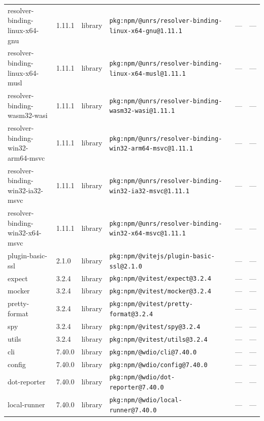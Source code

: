 \documentclass[11pt,a4paper]{article}
\begin{document}
\begin{longtable}{|p{4cm}|p{2cm}|p{1.6cm}|p{5cm}|p{1.5cm}|p{3.5cm}|}
\raggedright resolver-binding-linux-x64-gnu & 1.11.1 & library & \small\texttt{pkg:npm/@unrs/resolver-binding-linux-x64-gnu@1.11.1} & — & \small — \\
\raggedright resolver-binding-linux-x64-musl & 1.11.1 & library & \small\texttt{pkg:npm/@unrs/resolver-binding-linux-x64-musl@1.11.1} & — & \small — \\
\raggedright resolver-binding-wasm32-wasi & 1.11.1 & library & \small\texttt{pkg:npm/@unrs/resolver-binding-wasm32-wasi@1.11.1} & — & \small — \\
\raggedright resolver-binding-win32-arm64-msvc & 1.11.1 & library & \small\texttt{pkg:npm/@unrs/resolver-binding-win32-arm64-msvc@1.11.1} & — & \small — \\
\raggedright resolver-binding-win32-ia32-msvc & 1.11.1 & library & \small\texttt{pkg:npm/@unrs/resolver-binding-win32-ia32-msvc@1.11.1} & — & \small — \\
\raggedright resolver-binding-win32-x64-msvc & 1.11.1 & library & \small\texttt{pkg:npm/@unrs/resolver-binding-win32-x64-msvc@1.11.1} & — & \small — \\
\raggedright plugin-basic-ssl & 2.1.0 & library & \small\texttt{pkg:npm/@vitejs/plugin-basic-ssl@2.1.0} & — & \small — \\
\raggedright expect & 3.2.4 & library & \small\texttt{pkg:npm/@vitest/expect@3.2.4} & — & \small — \\
\raggedright mocker & 3.2.4 & library & \small\texttt{pkg:npm/@vitest/mocker@3.2.4} & — & \small — \\
\raggedright pretty-format & 3.2.4 & library & \small\texttt{pkg:npm/@vitest/pretty-format@3.2.4} & — & \small — \\
\raggedright spy & 3.2.4 & library & \small\texttt{pkg:npm/@vitest/spy@3.2.4} & — & \small — \\
\raggedright utils & 3.2.4 & library & \small\texttt{pkg:npm/@vitest/utils@3.2.4} & — & \small — \\
\raggedright cli & 7.40.0 & library & \small\texttt{pkg:npm/@wdio/cli@7.40.0} & — & \small — \\
\raggedright config & 7.40.0 & library & \small\texttt{pkg:npm/@wdio/config@7.40.0} & — & \small — \\
\raggedright dot-reporter & 7.40.0 & library & \small\texttt{pkg:npm/@wdio/dot-reporter@7.40.0} & — & \small — \\
\raggedright local-runner & 7.40.0 & library & \small\texttt{pkg:npm/@wdio/local-runner@7.40.0} & — & \small — \\

\end{longtable}
\end{document}
